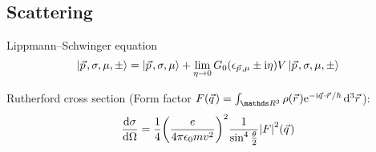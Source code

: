 	\subsection{Scattering}
		\noindent
		Lippmann--Schwinger equation
		\begin{equation}
			\Ket{\vec{p},\sigma,\mu,\pm} = \Ket{\vec{p}, \sigma, \mu} + \lim_{\eta \to 0} G_0(\epsilon_{\vec{p},\mu}\pm \i\eta) V \Ket{\vec{p},\sigma,\mu,\pm}
		\end{equation}

		\noindent
		Rutherford cross section (Form factor $F(\vec{q}) = \int_{\reals ^3} \rho(\vec{r}) \ex^{-\i \vec{q}\cdot\vec{r}/\hbar}\dd[3]{\vec{r}}$):
		\begin{equation}
			\dv{\sigma}{\Omega} = \frac{1}{4} \qty(\frac{e}{4\pi\epsilon_0 m v^2})^2
			\frac{1}{\sin^4\frac{\theta}{2}} \abs{F}^2(\vec{q})
		\end{equation}
